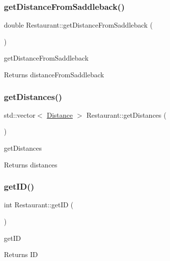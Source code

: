 \subsubsection{\texorpdfstring{get\+Distance\+From\+Saddleback()}{getDistanceFromSaddleback()}}
{\footnotesize\ttfamily double Restaurant\+::get\+Distance\+From\+Saddleback (\begin{DoxyParamCaption}{ }\end{DoxyParamCaption})}



get\+Distance\+From\+Saddleback 

\begin{DoxyReturn}{Returns}
distance\+From\+Saddleback 
\end{DoxyReturn}
\mbox{\label{class_restaurant_a4b76f9f7171cb961e33bb670c22e91f0}} 
\subsubsection{\texorpdfstring{get\+Distances()}{getDistances()}}
{\footnotesize\ttfamily std\+::vector$<$ \hyperlink{class_distance}{Distance} $>$ Restaurant\+::get\+Distances (\begin{DoxyParamCaption}{ }\end{DoxyParamCaption})}



get\+Distances 

\begin{DoxyReturn}{Returns}
distances 
\end{DoxyReturn}
\mbox{\label{class_restaurant_a8777e6d48839e275744145f394bde846}} 
\subsubsection{\texorpdfstring{get\+I\+D()}{getID()}}
{\footnotesize\ttfamily int Restaurant\+::get\+ID (\begin{DoxyParamCaption}{ }\end{DoxyParamCaption})}



get\+ID 

\begin{DoxyReturn}{Returns}
ID 
\end{DoxyReturn}
\mbox{\label{class_restaurant_a67da76f6ae80d9c22c8c697ebbb8a684}} 
